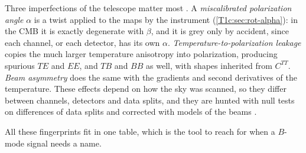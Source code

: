 Three imperfections of the telescope matter most \cite{HuHedmanZaldarriaga2003}. A \emph{miscalibrated polarization angle} $\alpha$ is a twist applied to the maps by the instrument (\cref{T1c:sec:rot-alpha}): in the CMB it is exactly degenerate with $\beta$, and it is grey only by accident, since each channel, or each detector, has its own $\alpha$. \emph{Temperature-to-polarization leakage}  copies the much larger temperature anisotropy into polarization, producing spurious $TE$ and $EE$, and $TB$ and $BB$ as well, with shapes inherited from $C^{TT}$. \emph{Beam asymmetry}  does the same with the gradients and second derivatives of the temperature. These effects depend on how the sky was scanned, so they differ between channels, detectors and data splits, and they are hunted with null tests on differences of data splits and corrected with models of the beams \cite{Planck2018V}.

\label{T1c:sec:table}%
All these fingerprints fit in one table, which is the tool to reach for when a $B$-mode signal needs a name.

